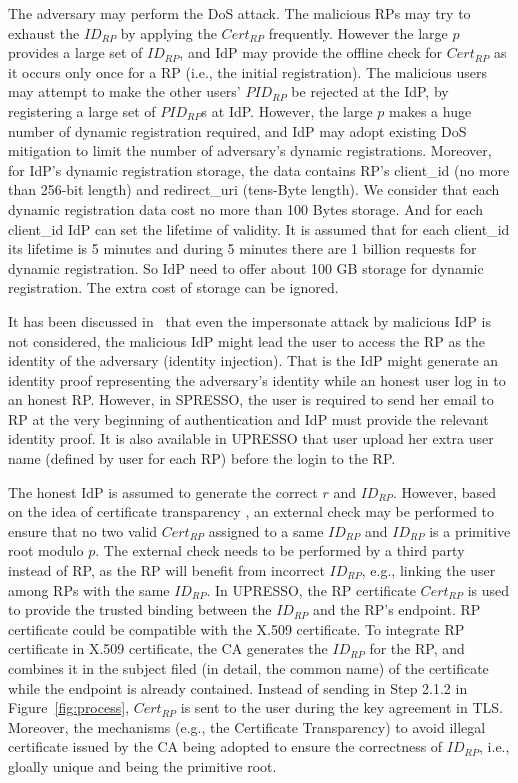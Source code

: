  The adversary may perform the DoS attack. The malicious RPs may try to exhaust the $ID_{RP}$  by applying the $Cert_{RP}$ frequently. However the large $p$ provides a large set of $ID_{RP}$, and IdP may provide the offline check for $Cert_{RP}$ as it occurs only once for a RP (i.e., the initial registration). The malicious users may attempt to make the other users' $PID_{RP}$ be rejected at the IdP, by registering a large set of $PID_{RP}$s at IdP. However, the large $p$ makes a huge number of dynamic registration required, and IdP may adopt existing DoS mitigation to limit the number of adversary's dynamic registrations. Moreover, for IdP's dynamic registration storage, the data contains RP's client\_id (no more than 256-bit length) and redirect\_uri (tens-Byte length). We consider that each dynamic registration data cost no more than 100 Bytes storage. And for each client\_id IdP can set the lifetime of validity. It is assumed that for each client\_id its lifetime is 5 minutes and during 5 minutes there are 1 billion requests for dynamic registration. So IdP need to offer about 100 GB storage for dynamic registration. The extra cost of storage can be ignored.

 It has been discussed in~\cite{SPRESSO} that even the impersonate attack by malicious IdP is not considered, the malicious IdP might lead the user to access the RP as the identity of the adversary (identity injection). That is the IdP might generate an identity proof representing the adversary's identity while an honest user log in to an honest RP. However, in SPRESSO, the user is required to send her email to RP at the very beginning of authentication and IdP must provide the relevant identity proof. It is also available in UPRESSO that user upload her extra user name (defined by user for each RP) before the login to the RP.

 The honest IdP is assumed to generate the correct $r$ and $ID_{RP}$.
However, based on the idea of certificate transparency \cite{rfc6962},
an external check may be performed to ensure that  no two valid $Cert_{RP}$ assigned to a same $ID_{RP}$ and $ID_{RP}$ is a primitive root modulo $p$.
The external check needs to be performed by a third party instead of RP, as the RP will benefit from incorrect $ID_{RP}$, e.g., linking the user among RPs with the same  $ID_{RP}$.
In UPRESSO, the RP certificate $Cert_{RP}$ is used to provide the trusted binding between the $ID_{RP}$ and the RP's endpoint. RP certificate could be compatible with the X.509 certificate. To integrate RP certificate in X.509 certificate, the CA generates the $ID_{RP}$ for the RP, and combines it in the subject  filed (in detail, the common name)  of the certificate while the endpoint is already contained. Instead of sending  in Step 2.1.2 in Figure~\ref{fig:process}, $Cert_{RP}$  is sent to the user during the key agreement in TLS. Moreover, the mechanisms (e.g., the Certificate Transparency) to avoid illegal certificate issued by the CA being adopted to ensure the correctness of $ID_{RP}$, i.e., gloally unique and being the primitive root.


